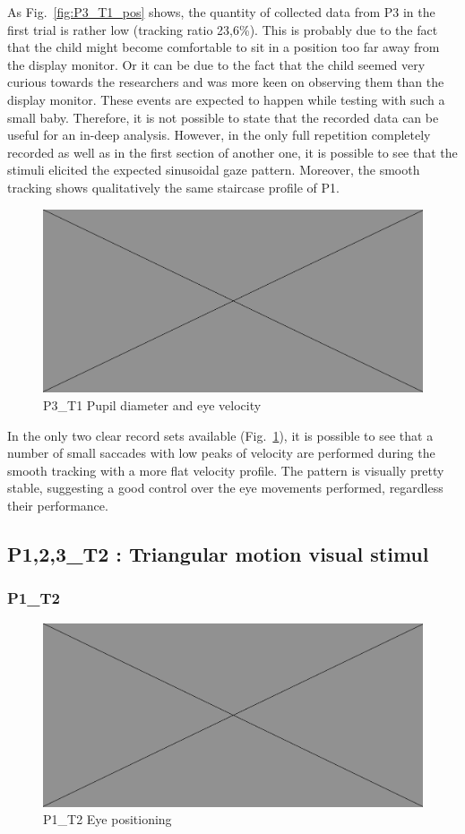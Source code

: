 As Fig.~\ref{fig:P3_T1_pos} shows, the quantity of collected data from P3 in the first trial is rather low (tracking ratio 23,6\%). This is probably due to the fact that the child might become comfortable to sit in a position too far away from the display monitor. Or it can be due to the fact that the child seemed very curious towards the researchers and was more keen on observing them than the display monitor. These events are expected to happen while testing with such a small baby. Therefore, it is not possible to state that the recorded data can be useful for an in-deep analysis. However, in the only full repetition completely recorded as well as in the first section of another one, it is possible to see that the stimuli elicited the expected sinusoidal gaze pattern. Moreover, the smooth tracking shows qualitatively the same staircase profile of P1.

\begin{figure}[h]
  \centering
  \includegraphics[width=.5\textwidth]{figures/placeholderImg.jpg}
  \caption[P3\_T1 pupil velocity]{P3\_T1 Pupil diameter and eye velocity}
  \label{fig:P3_T1_vel}
\end{figure}

In the only two clear record sets available (Fig.~\ref{fig:P3_T1_vel}), it is possible to see that a number of small saccades with low peaks of velocity are performed during the smooth tracking with a more flat velocity profile. The pattern is visually pretty stable, suggesting a good control over the eye movements performed, regardless their performance.



\subsection{P{1,2,3}\_T2 : Triangular motion visual stimul}
\label{sec:P123_T2}

\subsubsection{P1\_T2}
\label{sec:P1_T2}

\begin{figure}[h]
  \centering
  \includegraphics[width=.5\textwidth]{figures/placeholderImg.jpg}
  \caption[P1\_T2 Eye positioning]{P1\_T2 Eye positioning}
  \label{fig:P1_T2_pos}
\end{figure}

